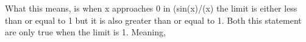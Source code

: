 \documentclass[preview]{standalone}
\begin{document}
\begin{center}
What this means, is when x approaches 0 in (sin(x)/(x) the limit is either less than or equal to 1 but it is also greater than or equal to 1. Both this statement are only true when the limit is 1. Meaning,
\end{center}
\end{document}
